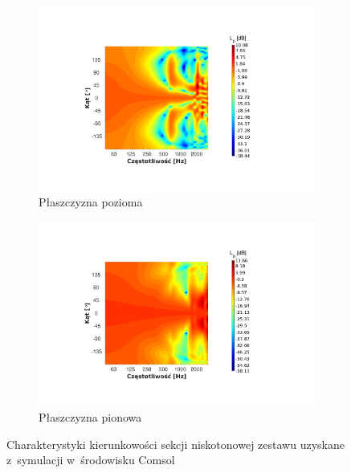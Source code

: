 \documentclass[12pt]{oska}
\begin{document}
	\begin{figure}[!ht]
		\centering
		\begin{subfigure}[b]{.8\textwidth}
			\includegraphics[width=\textwidth,trim={4.6cm 2.6cm 5.8cm 2.7cm},clip]{Comsol_kier_osie_hor.pdf}
			\caption{Płaszczyzna pozioma}
			\label{r:C_poziom}
		\end{subfigure}
		
		\begin{subfigure}[b]{.8\textwidth}
			\includegraphics[width=\textwidth,trim={4.6cm 2.6cm 5.8cm 2.7cm},clip]{Comsol_kier_osie_ver.pdf}
			\caption{Płaszczyzna pionowa}
			\label{r:C_pion}
		\end{subfigure}
		
		\caption{Charakterystyki kierunkowości sekcji niskotonowej zestawu uzyskane z~symulacji w~środowisku Comsol}
		\label{r:C_kierunk}
	\end{figure}
	
\end{document}
